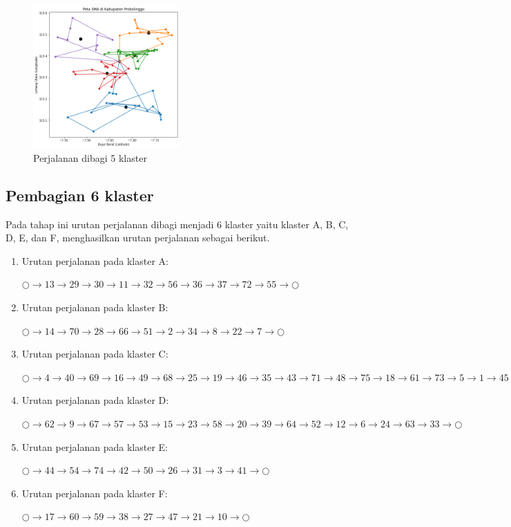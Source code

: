 \begin{figure}[H]
\centering
\includegraphics[width=0.5\textwidth]{Gambar/hasil_mtsp/5}
\caption{Perjalanan dibagi 5 klaster}
\label{fig:hasil_mtsp5}
\end{figure}

\subsection{Pembagian 6 klaster}

Pada tahap ini urutan perjalanan dibagi menjadi 6 klaster yaitu klaster A, B, C, D, E, dan F, menghasilkan urutan perjalanan sebagai berikut.

\begin{enumerate}

\item Urutan perjalanan pada klaster A:

$\bigcirc \to 13 \to 29 \to 30 \to 11 \to 32 \to 56 \to 36 \to 37 \to 72 \to 55 \to \bigcirc$

\item Urutan perjalanan pada klaster B:

$\bigcirc \to 14 \to 70 \to 28 \to 66 \to 51 \to 2 \to 34 \to 8 \to 22 \to 7 \to \bigcirc$

\item Urutan perjalanan pada klaster C:

$\bigcirc \to 4 \to 40 \to 69 \to 16 \to 49 \to 68 \to 25 \to 19 \to 46 \to 35 \to 43 \to 71 \to 48 \to 75 \to 18 \to 61 \to 73 \to 5 \to 1 \to 45 \to 65 \to \bigcirc$

\item Urutan perjalanan pada klaster D:

$\bigcirc \to 62 \to 9 \to 67 \to 57 \to 53 \to 15 \to 23 \to 58 \to 20 \to 39 \to 64 \to 52 \to 12 \to 6 \to 24 \to 63 \to 33 \to \bigcirc$

\item Urutan perjalanan pada klaster E:

$\bigcirc \to 44 \to 54 \to 74 \to 42 \to 50 \to 26 \to 31 \to 3 \to 41 \to \bigcirc$

\item Urutan perjalanan pada klaster F:

$\bigcirc \to 17 \to 60 \to 59 \to 38 \to 27 \to 47 \to 21 \to 10 \to \bigcirc$

\end{enumerate}

